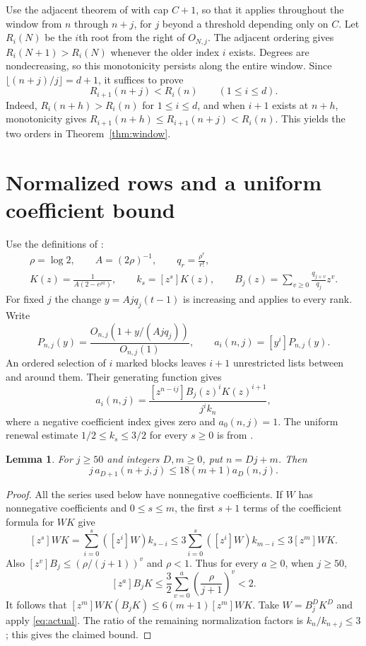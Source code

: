 \documentclass[10pt]{article}
\newtheorem{lemma}[theorem]{Lemma}
\begin{document}
Use the adjacent theorem of \cite[Theorem~1]{adjacent} with cap $C+1$, so that it applies throughout the window from $n$ through $n+j$, for $j$ beyond a threshold depending only on $C$. Let $R_i(N)$ be the $i$th root from the right of $O_{N,j}$. The adjacent ordering gives $R_i(N+1)>R_i(N)$ whenever the older index $i$ exists. Degrees are nondecreasing, so this monotonicity persists along the entire window. Since $\lfloor(n+j)/j\rfloor=d+1$, it suffices to prove
\begin{equation}\label{eq:fullperiod}
 R_{i+1}(n+j)<R_i(n)\qquad(1\le i\le d).
\end{equation}
Indeed, $R_i(n+h)>R_i(n)$ for $1\le i\le d$, and when $i+1$ exists at $n+h$, monotonicity gives $R_{i+1}(n+h)\le R_{i+1}(n+j)<R_i(n)$. This yields the two orders in Theorem~\ref{thm:window}.

\section{Normalized rows and a uniform coefficient bound}
Use the definitions of \cite[Section~2]{adjacent}:
\[
\begin{gathered}
\rho=\log 2,\qquad A=(2\rho)^{-1},\qquad q_r=\frac{\rho^r}{r!},\\
K(z)=\frac{1}{A(2-e^{\rho z})},\qquad k_s=[z^s]K(z),\qquad
B_j(z)=\sum_{v\ge0}\frac{q_{j+v}}{q_j}z^v .
\end{gathered}
\]
For fixed $j$ the change $y=Ajq_j(t-1)$ is increasing and applies to every rank. Write
\[
 P_{n,j}(y)=\frac{O_{n,j}(1+y/(Ajq_j))}{O_{n,j}(1)},\qquad a_i(n,j)=[y^i]P_{n,j}(y).
\]
An ordered selection of $i$ marked blocks leaves $i+1$ unrestricted lists between and around them. Their generating function gives
\begin{equation}\label{eq:actual}
 a_i(n,j)=\frac{[z^{n-ij}]B_j(z)^iK(z)^{i+1}}{j^i k_n},
\end{equation}
where a negative coefficient index gives zero and $a_0(n,j)=1$. The uniform renewal estimate $1/2\le k_s\le3/2$ for every $s\ge0$ is from \cite[Section~4]{adjacent}.

\begin{lemma}\label{lem:lead}
For $j\ge50$ and integers $D,m\ge0$, put $n=Dj+m$. Then
\[
 j\,a_{D+1}(n+j,j)\le18(m+1)a_D(n,j).
\]
\end{lemma}
\begin{proof}
All the series used below have nonnegative coefficients. If $W$ has nonnegative coefficients and $0\le s\le m$, the first $s+1$ terms of the coefficient formula for $WK$ give
\[
 [z^s]WK=\sum_{i=0}^{s}([z^i]W) k_{s-i}
 \le3\sum_{i=0}^{s}([z^i]W) k_{m-i}\le3[z^m]WK.
\]
Also $[z^v]B_j\le(\rho/(j+1))^v$ and $\rho<1$. Thus for every $a\ge0$, when $j\ge50$,
\[
 [z^a]B_jK\le\frac{3}{2}\sum_{v=0}^a \left(\frac{\rho}{j+1}\right)^v<2.
\]
It follows that $[z^m]WK(B_jK)\le6(m+1)[z^m]WK$. Take $W=B_j^D K^D$ and apply \eqref{eq:actual}. The ratio of the remaining normalization factors is $k_n/k_{n+j}\le3$; this gives the claimed bound.
\end{proof}
\end{document}
